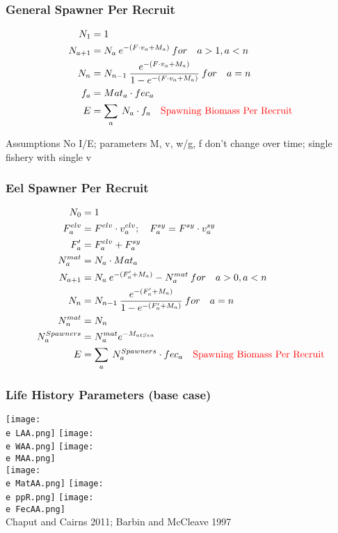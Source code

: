 \documentclass{beamer}
\newcommand{\e}{/SpinDr/backup/bio_data/bio.eels/figures/}
\begin{document}
\begin{frame}
	\frametitle{General Spawner Per Recruit}
	\begin{align*}
		N_1 &= 1 \\
		N_{a+1} &= N_a \: e^{-(F \cdot v_a+M_a)} \: for \quad a > 1, a< n\\ 
		N_{n} &= N_{n-1} \:\frac{e^{-(F \cdot v_a+M_a)}}{1-e^{-(F \cdot v_a +M_a)}}\: for \quad a=n \\
		f_a &= Mat_a \cdot fec_{a}\\
		E &= \sum_a \: N_{a} \cdot f_a \quad \text{\color{red} Spawning Biomass Per Recruit}\\
	\end{align*}
	\begin{block}{Assumptions}
	 No I/E; parameters M, v, w/g, f don't change over time; single fishery with single v 
	\end{block}
\end{frame}


\begin{frame}
	\frametitle{Eel Spawner Per Recruit}
	\begin{align*}
		N_0 &= 1 \\
		F^{elv}_a &= F^{elv} \cdot v^{elv}_a; \quad F^{sy}_a = F^{sy} \cdot v^{sy}_a \\ 
		F'_a &=  F^{elv}_a+F^{sy}_a  \\
		N^{mat}_a &= N_a \cdot Mat_a \\
		N_{a+1} &= N_a \: e^{-(F'_a +M_a)} - N^{mat}_a \: for \quad a > 0, a< n \\
		N_{n} &= N_{n-1} \:\frac{e^{-(F'_a+M_a)}}{1-e^{-(F'_a +M_a)}}\: for \quad a=n \\
		N^{mat}_n &= N_n \\
		N^{Spawners}_a &= N^{mat}_a e^{-M_{at Sea}} \\
		E &= \sum_a \: N^{Spawners}_a \cdot fec_a \quad \text{\color{red} Spawning Biomass Per Recruit} \\
	\end{align*}
\end{frame}




\begin{frame}
	\frametitle{Life History Parameters (base case)}
	\centering
	  \texttt{[image: \\e LAA.png]}
      \texttt{[image: \\e WAA.png]}
 \texttt{[image: \\e MAA.png]} \\

 \texttt{[image: \\e MatAA.png]}
 \texttt{[image: \\e ppR.png]}
	\texttt{[image: \\e FecAA.png]}\\[-1ex]
	{\tiny Chaput and Cairns 2011; Barbin and McCleave 1997 }
\end{frame}
\end{document}
